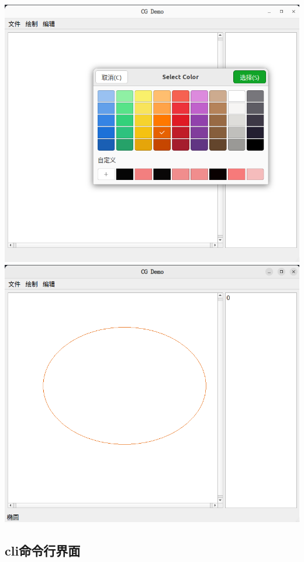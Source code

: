 \documentclass[a4paper,UTF8]{article}
\theoremstyle{definition}
\begin{document}
\begin{center}
	\includegraphics[width=6in]{figs/color1.png}
	\includegraphics[width=6in]{figs/color2.png}
\end{center}

\subsection{cli命令行界面}
\end{document}
